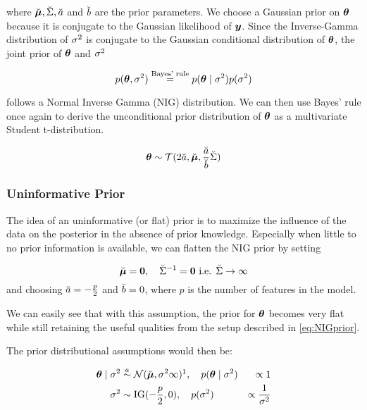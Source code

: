 where $\breve{\bm{\mu}}, \breve{\Sigma}, \breve{a}$ and $\breve{b}$ are the prior parameters.
We choose a Gaussian prior on $\bm{\theta}$ because it is conjugate to the Gaussian likelihood of $\bm{y}$.
Since the Inverse-Gamma distribution of $\sigma^2$ is conjugate to the Gaussian conditional distribution of $\bm{\theta}$, the joint prior of $\bm{\theta}$ and $\sigma^2$

\begin{equation*}
    p(\bm{\theta}, \sigma^2) \overset{\text{Bayes' rule}}{=} p(\bm{\theta} \mid \sigma^2) p(\sigma^2)
\end{equation*}

follows a Normal Inverse Gamma (NIG) distribution.
We can then use Bayes' rule once again to derive the unconditional prior distribution of $\bm{\theta}$ as a multivariate Student t-distribution.

\begin{equation*}
    \bm{\theta} \sim \mathcal{T}(2 \breve{a}, \breve{\bm{\mu}}, \frac{\breve{a}}{\breve{b}} \breve{\Sigma})
\end{equation*}

\subsubsection*{Uninformative Prior}
The idea of an uninformative (or flat) prior is to maximize the influence of the data on the posterior in the absence of prior knowledge.
Especially when little to no prior information is available, we can flatten the NIG prior by setting

\begin{equation*}
    \breve{\bm{\mu}} = \bm{0}, \quad \breve{\Sigma}^{-1} = \bm{0} \text{  i.e. } \breve{\Sigma} \to \infty 
\end{equation*}
and choosing $\breve{a} = - \frac{p}{2}$ and $\breve{b} = 0$, where $p$ is the number of features in the model.

We can easily see that with this assumption, the prior for $\bm{\theta}$ becomes very flat while still retaining the useful qualities from the setup described in \eqref{eq:NIGprior}.

The prior distributional assumptions would then be:

\begin{equation} \label{eq:flat-prior}
    \begin{aligned}
        \btheta \mid \ssd &\overset{a}{\sim}  \Ncal(\mupri, \ssd \infty)\footnotemark, \quad p(\btheta\mid \ssd) &\propto 1\\
        \ssd &\sim \IG(-\frac{p}{2},  0), \quad p(\ssd) &\propto \frac{1}{\ssd}
    \end{aligned}
\end{equation}

